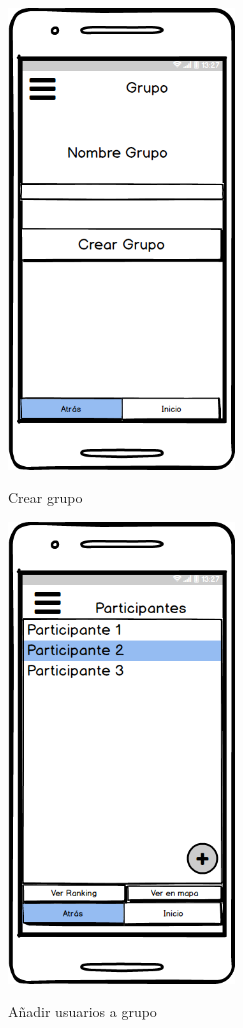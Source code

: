 	
	\begin{figure}[htbp]
\begin{minipage}[b]{0.5\linewidth} %
\centering
\includegraphics[width=6cm]{maqueta/Crear-Grupo.png}
 \label{figura1}
\caption{Crear grupo}

\end{minipage}
\hspace{0.5cm} %
\begin{minipage}[b]{0.5\linewidth}
\centering
\includegraphics[width=6cm]{maqueta/Ver-Miembros-grupo.png}
 \label{figura2}
\caption{Añadir usuarios a grupo}

\end{minipage}
\end{figure}
	
